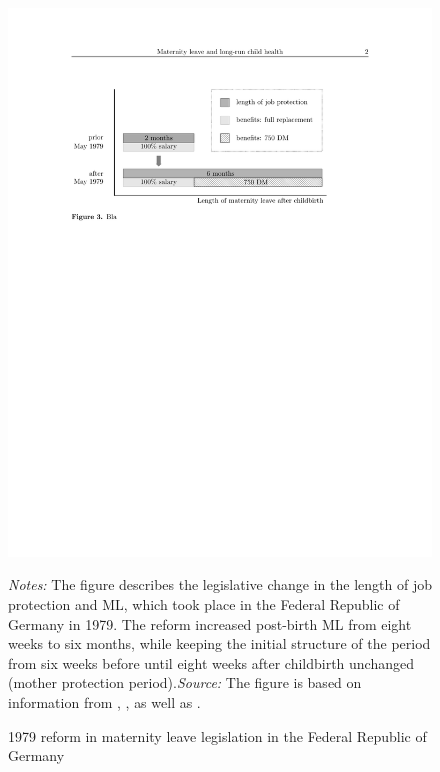 \documentclass[11pt, a4paper, draft]{article} %
\begin{document}
\begin{figure}[H]\centering
	\caption{1979 reform in maternity leave legislation in the Federal Republic of Germany}\label{fig: MLreform}
	\includegraphics[width=0.8\linewidth]{SOEP/Reform_shortened.pdf}
	\begin{minipage}{\linewidth}
		\scriptsize{\emph{Notes:} The figure describes the legislative change in the length of job protection and ML, which took place in the Federal Republic of Germany in 1979. The reform increased post-birth ML from eight weeks to six months, while keeping the initial structure of the period from six weeks before until eight weeks after childbirth unchanged (mother protection period).\newline \textit{Source: }The figure is based on information from \cite{Dustmann2012}, \cite{DIW2002}, \cite{schonberg2014expansions} as well as \cite{zmarzlik1999mutterschutzgesetz}.}
	\end{minipage}
\end{figure}
\end{document}
